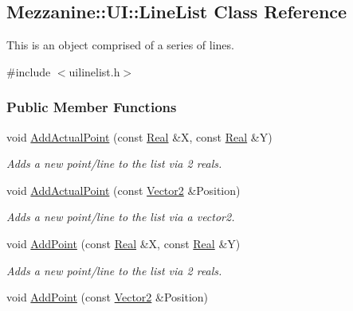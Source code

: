 \hypertarget{classMezzanine_1_1UI_1_1LineList}{
\subsection{Mezzanine::UI::LineList Class Reference}
\label{classMezzanine_1_1UI_1_1LineList}
}


This is an object comprised of a series of lines.  




{\ttfamily \#include $<$uilinelist.h$>$}

\subsubsection*{Public Member Functions}
\begin{DoxyCompactItemize}
\item 
void \hyperlink{classMezzanine_1_1UI_1_1LineList_a78c3f9e972886851cbe877c8cde4e027}{AddActualPoint} (const \hyperlink{namespaceMezzanine_a726731b1a7df72bf3583e4a97282c6f6}{Real} \&X, const \hyperlink{namespaceMezzanine_a726731b1a7df72bf3583e4a97282c6f6}{Real} \&Y)
\begin{DoxyCompactList}\small\item\em Adds a new point/line to the list via 2 reals. \item\end{DoxyCompactList}\item 
void \hyperlink{classMezzanine_1_1UI_1_1LineList_a9f457889822f8c236d2e0cf7fccd8aeb}{AddActualPoint} (const \hyperlink{classMezzanine_1_1Vector2}{Vector2} \&Position)
\begin{DoxyCompactList}\small\item\em Adds a new point/line to the list via a vector2. \item\end{DoxyCompactList}\item 
void \hyperlink{classMezzanine_1_1UI_1_1LineList_a6f689d10188e5973033fe7448ac7c68d}{AddPoint} (const \hyperlink{namespaceMezzanine_a726731b1a7df72bf3583e4a97282c6f6}{Real} \&X, const \hyperlink{namespaceMezzanine_a726731b1a7df72bf3583e4a97282c6f6}{Real} \&Y)
\begin{DoxyCompactList}\small\item\em Adds a new point/line to the list via 2 reals. \item\end{DoxyCompactList}\item 
void \hyperlink{classMezzanine_1_1UI_1_1LineList_a40a814e86853fed53fc1bf4a7bde5e69}{AddPoint} (const \hyperlink{classMezzanine_1_1Vector2}{Vector2} \&Position)

\end{DoxyCompactItemize}
